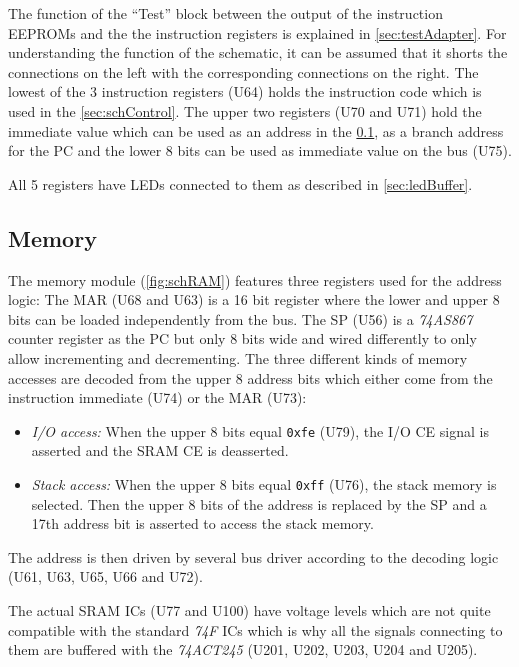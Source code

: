 The function of the ``Test'' block between the output of the instruction \glspl{EEPROM} and the the instruction registers is explained in \cref{sec:testAdapter}.
For understanding the function of the schematic, it can be assumed that it shorts the connections on the left with the corresponding connections on the right.
The lowest of the 3 instruction registers (U64) holds the instruction code which is used in the \cref{sec:schControl}.
The upper two registers (U70 and U71) hold the immediate value which can be used as an address in the \cref{sec:schMemory}, as a branch address for the \gls{PC} and the lower 8 bits can be used as immediate value on the bus (U75).

All 5 registers have \glspl{LED} connected to them as described in \cref{sec:ledBuffer}.
\subsection{Memory}\label{sec:schMemory}
The memory module (\cref{fig:schRAM}) features three registers used for the address logic:
The \gls{MAR} (U68 and U63) is a 16 bit register where the lower and upper 8 bits can be loaded independently from the bus.
The \gls{SP} (U56) is a \emph{74AS867} counter register as the \gls{PC} but only 8 bits wide and wired differently to only allow incrementing and decrementing.
The three different kinds of memory accesses are decoded from the upper 8 address bits which either come from the instruction immediate (U74) or the \gls{MAR} (U73):
\begin{itemize}
  \item \emph{I/O access:} When the upper 8 bits equal \texttt{0xfe} (U79), the I/O \gls{CE} signal is asserted and the \gls{SRAM} \gls{CE} is deasserted.
  \item \emph{Stack access:} When the upper 8 bits equal \texttt{0xff} (U76), the stack memory is selected.
        Then the upper 8 bits of the address is replaced by the \gls{SP} and a 17th address bit is asserted to access the stack memory.
\end{itemize}
The address is then driven by several bus driver according to the decoding logic (U61, U63, U65, U66 and U72).

The actual \gls{SRAM} \glspl{IC} (U77 and U100) have voltage levels which are not quite compatible with the standard \emph{74F} \glspl{IC} \cite{AS6C4008} which is why all the signals connecting to them are buffered with the \emph{74ACT245} \cite{74act245} (U201, U202, U203, U204 and U205).

